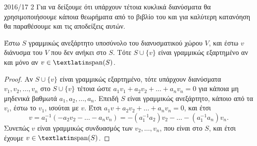 \documentclass[a4paper,11pt]{article}
\begin{document}
\begin{solution}{2016/17 2}
    Για να δείξουμε ότι υπάρχουν τέτοια κυκλικά διανύσματα θα χρησιμοποιήσουμε
    κάποια θεωρήματα από το βιβλίο του  \cite{friedberg2003linear}
    και για καλύτερη κατανόηση θα παραθέσουμε και τις αποδείξεις αυτών.
    \begin{thrm}
        \label{theo:1617_span}
        Έστω \( S \) γραμμικώς ανεξάρτητο υποσύνολο του διανυσματικού χώρου
        \( V \), και έστω \( v \) διάνυσμα του \( V \) που δεν ανήκει στο \( S \).
        Τότε \( S \cup \{v\} \) είναι γραμμικώς εξαρτημένο αν και μόνο αν \( v
        \in \text{\tl{span}}(S) \).
    \end{thrm}
    \begin{proof}
        Αν \( S \cup \{v\} \) είναι γραμμικώς εξαρτημένο, τότε υπάρχουν
        διανύσματα \( v_1, v_2, \dots, v_n \) στο \( S \cup \{v\} \) τέτοια ώστε
        \( a_1v_1 + a_2v_2 + \dots + a_nv_n = 0 \) για κάποια μη μηδενικά
        βαθμωτά \( a_1, a_2, \dots, a_n \). Επειδή \( S \) είναι γραμμικώς
        ανεξάρτητο, κάποιο από τα \( v_i \), έστω το \( v_1 \), ισούται με \( v
        \). Έτσι \( a_1v + a_2v_2 + \dots + a_nv_n = 0 \), και έτσι
        \begin{equation*}
            v  = a_1^{-1}(-a_2v_2 - \dots - a_nv_n) = - (a_1^{-1}a_2)v_2 - \dots -
            (a_1^{-1}a_n)v_n.
        \end{equation*}
        Συνεπώς \( v \) είναι γραμμικώς συνδυασμός των \( v_2, \dots, v_n \),
        που είναι στο \( S \), και έτσι έχουμε \( v \in \text{\tl{span}}(S) \).


\end{proof}
\end{solution}
\end{document}
